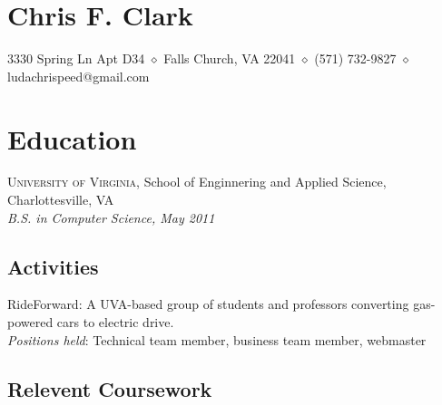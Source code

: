 \documentclass[a4paper]{article}
\makeatletter
\newcommand{\address}{3330 Spring Ln Apt D34 $\diamond$ Falls Church, VA 22041
  $\diamond$ (571) 732-9827 $\diamond$ ludachrispeed@gmail.com}
\makeatother
\begin{document}

\section*{\LARGE Chris F. Clark}
\vskip -5pt \address

\section*{Education}

  \textsc{University of Virginia}, School of Enginnering and Applied
  Science, Charlottesville, VA \\
  \textsl{B.S. in Computer Science, May 2011}

  \subsection*{Activities}

  RideForward: A UVA-based group of students and professors converting gas-powered cars
    to electric drive. \\ 
  \textsl{Positions held}: Technical team member, business team member, webmaster

  \subsection*{Relevent Coursework}
\end{document}
